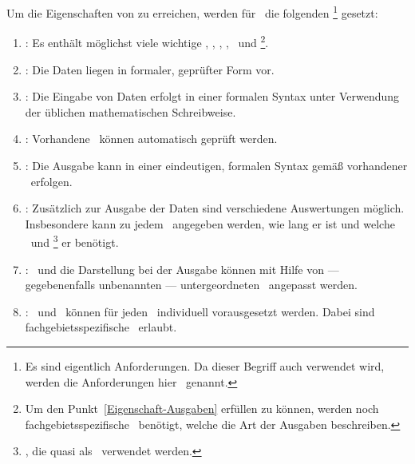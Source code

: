 \section[Ziele]{\Ziele}%
\beginsection  {\Ziele}
\label      {sec-Ziele}

Um die Eigenschaften von  zu erreichen, werden für \ASBA\ die folgenden \Ziele%
\footnote{%
	Es sind eigentlich Anforderungen.
	Da dieser Begriff auch  verwendet wird, werden die Anforderungen hier \Ziele\ genannt.
}
gesetzt:
\begin{enumerate}
	\item \label{Ziel-Daten} :
	Es enthält möglichst viele wichtige \Axiome, \Saetze, \Beweise, \Fachbegriffe, \Fachgebiete\ und \Ausgabeschemata%
	\footnote{%
		Um den Punkt~\ref{Eigenschaft-Ausgaben}  erfüllen zu können, werden noch fachgebietsspezifische \Ausgabeschemata\ benötigt, welche die Art der Ausgaben beschreiben.
	}.
	\item \label{Ziel-Form} :
	Die Daten liegen in formaler, geprüfter Form vor.
	\item \label{Ziel-Eingaben} :
	Die Eingabe von Daten erfolgt in einer formalen Syntax unter Verwendung der üblichen mathematischen Schreibweise.
	\item \label{Ziel-Pruefung} :
	Vorhandene \Beweise\ können automatisch geprüft werden.
	\item \label{Ziel-Ausgaben} :
	Die Ausgabe kann in einer eindeutigen, formalen Syntax gemäß vorhandener \Ausgabeschemata\ erfolgen.
	\item \label{Ziel-Auswertungen} :
	Zusätzlich zur Ausgabe der Daten sind verschiedene Auswertungen möglich.
	Insbesondere kann zu jedem \Beweis\ angegeben werden, wie lang er ist und welche \Axiome\ und \Saetze%
	\footnote{
		\Saetze, die quasi als \Axiome\ verwendet werden.
	}
	er benötigt.
	\item \label{Ziel-Anpassbarkeit} :
	\Fachbegriffe\ und die Darstellung bei der Ausgabe können mit Hilfe von --- gegebenenfalls unbenannten --- untergeordneten \Fachgebieten\ angepasst werden.
	\item \label{Ziel-Individualitaet} :
	\Axiome\ und \Saetze\ können für jeden \Beweis\ individuell vorausgesetzt werden.
	Dabei sind fachgebietsspezifische \Fachbegriffe\ erlaubt.

\end{enumerate}
